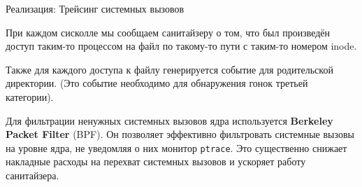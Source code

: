 \begin{frame}[label=current]{Реализация: Трейсинг системных вызовов}
{            При каждом сисколле мы сообщаем санитайзеру о том, что был произведён доступ таким-то процессом
            на файл по такому-то пути с таким-то номером inode.

            Также для каждого доступа к файлу генерируется событие  для родительской директории.
            (Это событие необходимо для обнаружения гонок третьей категории).

            Для фильтрации ненужных системных вызовов ядра используется \textbf{Berkeley Packet Filter} (BPF).
            Он позволяет эффективно фильтровать системные вызовы на уровне ядра, не уведомляя о них монитор \texttt{ptrace}.
            Это существенно снижает накладные расходы на перехват системных вызовов и ускоряет работу санитайзера.
        }
    \end{frame}

